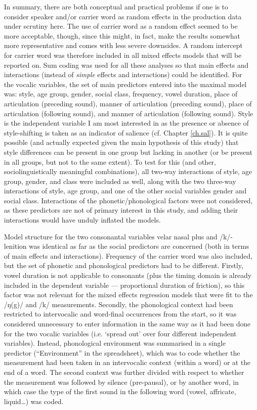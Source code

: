 In summary, there are both conceptual and practical problems if one is to consider speaker and/or carrier word as random effects in the production data under scrutiny here.
The use of carrier word as a random effect seemed to be more acceptable, though, since this might, in fact, make the results somewhat more representative and comes with less severe downsides.
A random intercept for carrier word was therefore included in all mixed effects models that will be reported on.
Sum coding was used for all these analyses so that main effects and interactions (instead of \emph{simple} effects and interactions) could be identified.
For the vocalic variables, the set of main predictors entered into the maximal model was: style, age group, gender, social class, frequency, vowel duration, place of articulation (preceding sound), manner of articulation (preceding sound), place of articulation (following sound), and manner of articulation (following sound).
Style is the independent variable I am most interested in as the presence or absence of style-shifting is taken as an indicator of salience (cf. Chapter \ref{ch.sal}).
It is quite possible (and actually expected given the main hypothesis of this study) that style differences can be present in one group but lacking in another (or be present in all groups, but not to the same extent).
To test for this (and other, sociolinguistically meaningful combinations), all two-way interactions of style, age group, gender, and class were included as well, along with the two three-way interactions of style, age group, and one of the other social variables gender and social class.
Interactions of the phonetic/phonological factors were not considered, as these predictors are not of primary interest in this study, and adding their interactions would have unduly inflated the models.

Model structure for the two consonantal variables velar nasal plus and /k/-lenition was identical as far as the social predictors are concerned (both in terms of main effects and interactions).
Frequency of the carrier word was also included, but the set of phonetic and phonological predictors had to be different.
Firstly, vowel duration is not applicable to consonants (plus the timing domain is already included in the dependent variable --- proportional duration of friction), so this factor was not relevant for the mixed effects regression models that were fit to the /ŋ(g)/ and /k/ measurements.
Secondly, the phonological context had been restricted to intervocalic and word-final occurrences from the start, so it was considered unnecessary to enter information in the same way as it had been done for the two vocalic variables (i.e. `spread out' over four different independent variables).
Instead, phonological environment was summarised in a single predictor (``Environment'' in the spreadsheet), which was to code whether the measurement had been taken in an intervocalic context (within a word) or at the end of a word.
The second context was further divided with respect to whether the measurement was followed by silence (pre-pausal), or by another word, in which case the type of the first sound in the following word (vowel, affricate, liquid\ldots) was coded.

